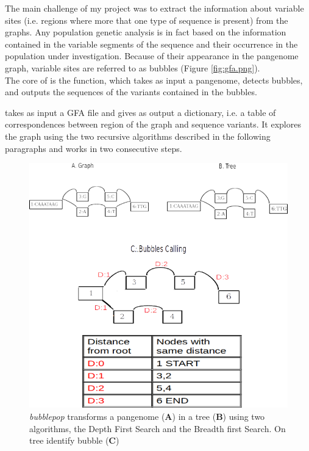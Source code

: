The main challenge of my project was to extract the information about variable sites (i.e. regions where more that one type of sequence is present) from the graphs. Any population genetic analysis is in fact based on the information contained in the variable segments of the sequence and their occurrence in the population under investigation. Because of their appearance in the pangenome graph, variable sites are referred to as bubbles (Figure \ref{fig:gfa.png}). \\

The core of \vgp is the \bbp function, which takes as input a pangenome, detects bubbles, and outputs the sequences of the variants contained in the bubbles.

\bbp takes as input a GFA file and gives as output a dictionary, i.e. a table of correspondences between region of the graph and sequence variants. It explores the graph using the two recursive algorithms described in the following paragraphs and works in two consecutive steps. 


\begin{figure}[H]
\centering
\includegraphics[width=1.00\textwidth]{fig/bubblepop.png}
\decoRule
\caption{\textit{bubblepop} transforms a pangenome (\textbf{A}) in a tree (\textbf{B}) using two algorithms, the Depth First Search and the Breadth first Search. On tree identify bubble (\textbf{C})}
\label{fig:bubblepop.png}
\end{figure}


